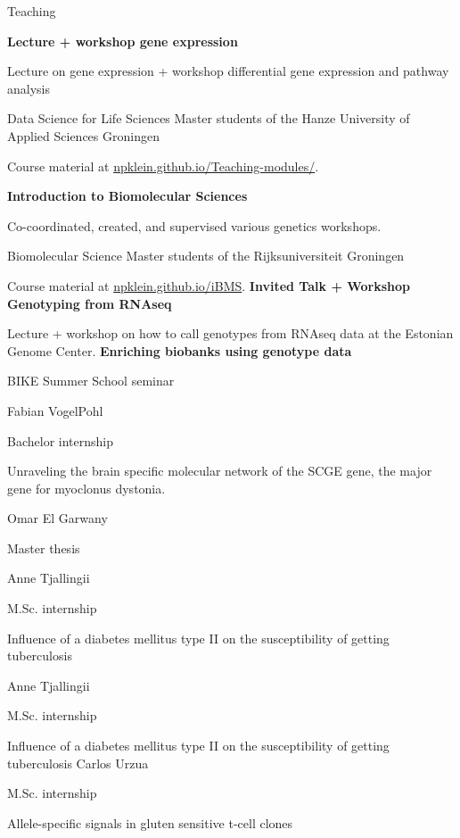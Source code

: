 \begin{rubric}{Teaching}
%
%


\entry*[Sep 2019]%
\textbf{Lecture + workshop gene expression} \par
Lecture on gene expression + workshop differential gene expression and pathway analysis \par
Data Science for Life Sciences Master students of the Hanze University of Applied Sciences Groningen \par
Course material at \url{npklein.github.io/Teaching-modules/}.


%
	\textbf{Introduction to Biomolecular Sciences} \par
	 Co-coordinated, created, and supervised various genetics workshops. \par
	 Biomolecular Science Master students of the Rijksuniversiteit Groningen \par
	 Course material at \url{npklein.github.io/iBMS}.
%
\entry*[26 Aug 2016]%
\textbf{Invited Talk + Workshop Genotyping from RNAseq} \par
Lecture + workshop on how to call genotypes from RNAseq data at the Estonian Genome Center.
%
\entry*[22 Jun 2016]%
\textbf{Enriching biobanks using genotype data} \par
BIKE Summer School seminar
%

\entry*[Apr 2019 -- ]%
Fabian VogelPohl \par
Bachelor internship \par
Unraveling the brain specific molecular network of the SCGE gene, the major gene for myoclonus dystonia. 

%
Omar El Garwany \par
Master thesis \par


%
Anne Tjallingii \par
M.Sc. internship \par
Influence of a diabetes mellitus type II on the susceptibility of getting tuberculosis

%
Anne Tjallingii \par
M.Sc. internship \par
Influence of a diabetes mellitus type II on the susceptibility of getting tuberculosis
%
%
Carlos Urzua \par
M.Sc. internship \par
Allele-specific signals in gluten sensitive t-cell clones

\end{rubric}